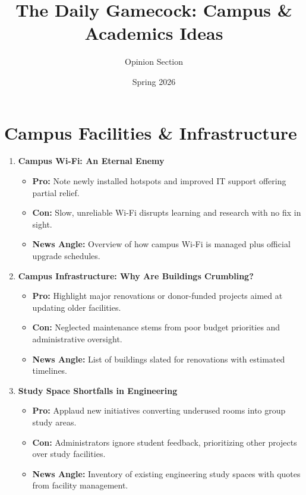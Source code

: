 \documentclass{article}
\title{The Daily Gamecock: Campus \& Academics Ideas}
\author{Opinion Section}
\date{Spring 2026}
\begin{document}
\maketitle

\section*{Campus Facilities \& Infrastructure}

\begin{enumerate}[leftmargin=*]
    \item \textbf{Campus Wi-Fi: An Eternal Enemy}
    \begin{itemize}
        \item \textbf{Pro:} Note newly installed hotspots and improved IT support offering partial relief.
        \item \textbf{Con:} Slow, unreliable Wi-Fi disrupts learning and research with no fix in sight.
        \item \textbf{News Angle:} Overview of how campus Wi-Fi is managed plus official upgrade schedules.
    \end{itemize}

    \item \textbf{Campus Infrastructure: Why Are Buildings Crumbling?}
    \begin{itemize}
        \item \textbf{Pro:} Highlight major renovations or donor-funded projects aimed at updating older facilities.
        \item \textbf{Con:} Neglected maintenance stems from poor budget priorities and administrative oversight.
        \item \textbf{News Angle:} List of buildings slated for renovations with estimated timelines.
    \end{itemize}

    \item \textbf{Study Space Shortfalls in Engineering}
    \begin{itemize}
        \item \textbf{Pro:} Applaud new initiatives converting underused rooms into group study areas.
        \item \textbf{Con:} Administrators ignore student feedback, prioritizing other projects over study facilities.
        \item \textbf{News Angle:} Inventory of existing engineering study spaces with quotes from facility management.
    \end{itemize}


\end{enumerate}
\end{document}
